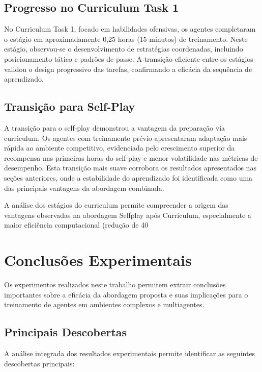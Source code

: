 \subsection{Progresso no Curriculum Task 1}

No Curriculum Task 1, focado em habilidades ofensivas, os agentes completaram o estágio em aproximadamente 0,25 horas (15 minutos) de treinamento. Neste estágio, observou-se o desenvolvimento de estratégias coordenadas, incluindo posicionamento tático e padrões de passe. A transição eficiente entre os estágios validou o design progressivo das tarefas, confirmando a eficácia da sequência de aprendizado.

\subsection{Transição para Self-Play}

A transição para o self-play demonstrou a vantagem da preparação via curriculum. Os agentes com treinamento prévio apresentaram adaptação mais rápida ao ambiente competitivo, evidenciada pelo crescimento superior da recompensa nas primeiras horas do self-play e menor volatilidade nas métricas de desempenho. Esta transição mais suave corrobora os resultados apresentados nas seções anteriores, onde a estabilidade do aprendizado foi identificada como uma das principais vantagens da abordagem combinada.

A análise dos estágios do curriculum permite compreender a origem das vantagens observadas na abordagem Selfplay após Curriculum, especialmente a maior eficiência computacional (redução de 40%

\section{Conclusões Experimentais}
\label{sec:conclusoes_experimentais}

Os experimentos realizados neste trabalho permitem extrair conclusões importantes sobre a eficácia da abordagem proposta e suas implicações para o treinamento de agentes em ambientes complexos e multiagentes.

\subsection{Principais Descobertas}

A análise integrada dos resultados experimentais permite identificar as seguintes descobertas principais:


